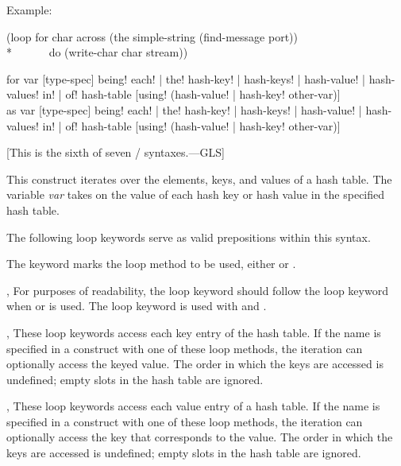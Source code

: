 \begin{new}
\begin{defloop}
  Example:
\begin{lisp}
(loop for char across (the simple-string (find-message port)) \\*
~~~~~~do (write-char char stream))
\end{lisp}
\end{defloop}

\begin{defloop}
for var [type-spec] \!being! {\!each! | \!the!}
                    {\!hash-key! | \!hash-keys! | \!hash-value! | \!hash-values!}
                    {\!in! | \!of!} hash-table [\!using! ({\!hash-value! | \!hash-key!} other-var)] \\
as var [type-spec] \!being! {\!each! | \!the!}
                    {\!hash-key! | \!hash-keys! | \!hash-value! | \!hash-values!}
                    {\!in! | \!of!} hash-table [\!using! ({\!hash-value! | \!hash-key!} other-var)]

[This is the sixth of seven / syntaxes.---GLS]

This construct iterates over the elements, keys, and values of a hash
table.  The variable {\it var\/} takes on the value of each hash key
or hash value in the specified hash table. 

The following loop keywords serve as valid prepositions within this syntax.

\begin{flushdesc}
\item[\cd{being}]
The keyword  marks the loop method to be used, either 
 or .

\item[\cd{each}, \cd{the}]
For purposes of readability, the loop keyword 
should follow the loop keyword  when  or
 is used.  The loop keyword  is used with
 and .

\item[\cd{hash-key}, \cd{hash-keys}]
These loop keywords access each key entry of the hash table.  If
the name  is specified in a  construct with one
of these loop methods, the iteration can optionally access the keyed
value. The order in which the keys are accessed is undefined; empty
slots in the hash table are ignored.

\item[\cd{hash-value}, \cd{hash-values}]
These loop keywords access each value entry of a hash table.  If
the name  is specified in a  construct with one of
these loop methods, the iteration can optionally access the key that
corresponds to the value.  The order in which the keys are accessed is
undefined; empty slots in the hash table are ignored.


\end{flushdesc}
\end{defloop}
\end{new}
